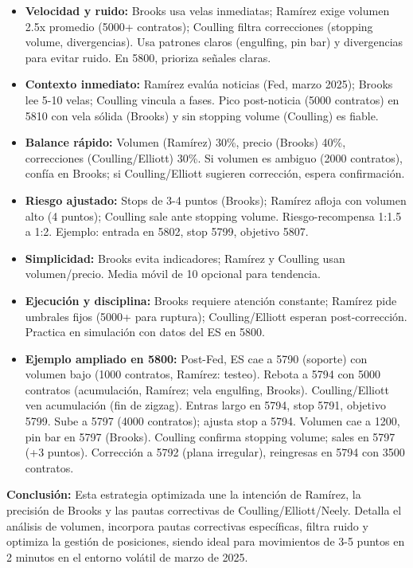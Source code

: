 \begin{itemize}
    \item \textbf{Velocidad y ruido:} Brooks usa velas inmediatas; Ram\'irez exige volumen 2.5x promedio (5000+ contratos); Coulling filtra correcciones (stopping volume, divergencias). Usa patrones claros (engulfing, pin bar) y divergencias para evitar ruido. En 5800, prioriza se\~{n}ales claras.

    \item \textbf{Contexto inmediato:} Ram\'irez eval\'ua noticias (Fed, marzo 2025); Brooks lee 5-10 velas; Coulling vincula a fases. Pico post-noticia (5000 contratos) en 5810 con vela s\'olida (Brooks) y sin stopping volume (Coulling) es fiable.

    \item \textbf{Balance r\'{a}pido:} Volumen (Ram\'irez) 30\%, precio (Brooks) 40\%, correcciones (Coulling/Elliott) 30\%. Si volumen es ambiguo (2000 contratos), conf\'ia en Brooks; si Coulling/Elliott sugieren correcci\'{o}n, espera confirmaci\'{o}n.

    \item \textbf{Riesgo ajustado:} Stops de 3-4 puntos (Brooks); Ram\'irez afloja con volumen alto (4 puntos); Coulling sale ante stopping volume. Riesgo-recompensa 1:1.5 a 1:2. Ejemplo: entrada en 5802, stop 5799, objetivo 5807.

    \item \textbf{Simplicidad:} Brooks evita indicadores; Ram\'irez y Coulling usan volumen/precio. Media m\'ovil de 10 opcional para tendencia.

    \item \textbf{Ejecuci\'{o}n y disciplina:} Brooks requiere atenci\'on constante; Ram\'irez pide umbrales fijos (5000+ para ruptura); Coulling/Elliott esperan post-correcci\'{o}n. Practica en simulaci\'on con datos del ES en 5800.

    \item \textbf{Ejemplo ampliado en 5800:} Post-Fed, ES cae a 5790 (soporte) con volumen bajo (1000 contratos, Ram\'irez: testeo). Rebota a 5794 con 5000 contratos (acumulaci\'{o}n, Ram\'irez; vela engulfing, Brooks). Coulling/Elliott ven acumulaci\'{o}n (fin de zigzag). Entras largo en 5794, stop 5791, objetivo 5799. Sube a 5797 (4000 contratos); ajusta stop a 5794. Volumen cae a 1200, pin bar en 5797 (Brooks). Coulling confirma stopping volume; sales en 5797 (+3 puntos). Correcci\'{o}n a 5792 (plana irregular), reingresas en 5794 con 3500 contratos.
\end{itemize}

\textbf{Conclusi\'{o}n:} Esta estrategia optimizada une la intenci\'{o}n de Ram\'irez, la precisi\'{o}n de Brooks y las pautas correctivas de Coulling/Elliott/Neely. Detalla el an\'alisis de volumen, incorpora pautas correctivas espec\'ificas, filtra ruido y optimiza la gesti\'on de posiciones, siendo ideal para movimientos de 3-5 puntos en 2 minutos en el entorno vol\'{a}til de marzo de 2025.
